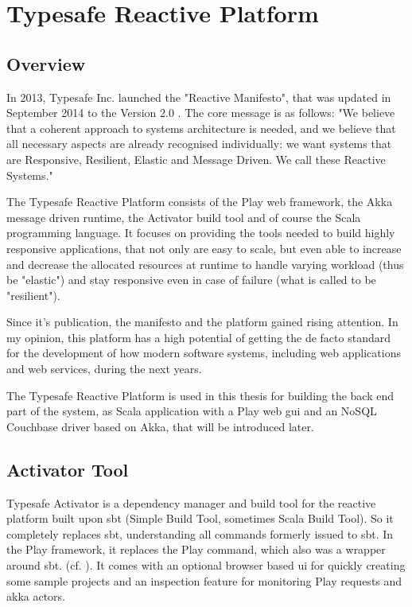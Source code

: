 \section{Typesafe Reactive Platform}

\subsection{Overview}

In 2013, Typesafe Inc. launched the "Reactive Manifesto", that was updated in September 2014 to the Version 2.0 \cite{reactivemanifesto}. The core message is as follows: "We believe that a coherent approach to systems architecture is needed, and we believe that all necessary aspects are already recognised individually: we want systems that are Responsive, Resilient, Elastic and Message Driven. We call these Reactive Systems."

The Typesafe Reactive Platform consists of the Play web framework, the Akka message driven runtime, the Activator build tool and of course the Scala programming language. It focuses on providing the tools needed to build highly responsive applications, that not only are easy to scale, but even able to increase and decrease the allocated resources at runtime to handle varying workload (thus be "elastic") and stay responsive even in case of failure (what is called to be "resilient").

Since it's publication, the manifesto and the platform gained rising attention. In my opinion, this platform has a high potential of getting the de facto standard for the development of how modern software systems, including web applications and web services, during the next years.

The Typesafe Reactive Platform is used in this thesis for building the back end part of the system, as Scala application with a Play web gui and an NoSQL Couchbase driver based on Akka, that will be introduced later. %

\subsection{Activator Tool}

Typesafe Activator is a dependency manager and build tool for the reactive platform built upon sbt (Simple Build Tool, sometimes Scala Build Tool). So it completely replaces sbt, understanding all commands formerly issued to sbt. In the Play framework, it replaces the Play command, which also was a wrapper around sbt. (cf. \cite{typesafeact}). It comes with an optional browser based ui for quickly creating some sample projects and an inspection feature for monitoring Play requests and akka actors. 

